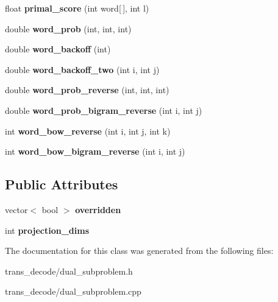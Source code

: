 \begin{DoxyCompactItemize}
\item 
\hypertarget{class_subproblem_adfba5511e1f004b989f7b2e03d998c4e}{
float {\bfseries primal\_\-score} (int word\mbox{[}$\,$\mbox{]}, int l)}
\label{class_subproblem_adfba5511e1f004b989f7b2e03d998c4e}

\item 
\hypertarget{class_subproblem_ab5e3b5e167561a79da1d815af120b6bd}{
double {\bfseries word\_\-prob} (int, int, int)}
\label{class_subproblem_ab5e3b5e167561a79da1d815af120b6bd}

\item 
\hypertarget{class_subproblem_acc456e9852f19058da2d884feec15679}{
double {\bfseries word\_\-backoff} (int)}
\label{class_subproblem_acc456e9852f19058da2d884feec15679}

\item 
\hypertarget{class_subproblem_afd0b98fea6ebb39ae5ad46d1010cb6a3}{
double {\bfseries word\_\-backoff\_\-two} (int i, int j)}
\label{class_subproblem_afd0b98fea6ebb39ae5ad46d1010cb6a3}

\item 
\hypertarget{class_subproblem_a32718cd109a52be59a7eecd3dc5f4c8a}{
double {\bfseries word\_\-prob\_\-reverse} (int, int, int)}
\label{class_subproblem_a32718cd109a52be59a7eecd3dc5f4c8a}

\item 
\hypertarget{class_subproblem_ab612e729dd11b5ac27ce9f67e0135c0a}{
double {\bfseries word\_\-prob\_\-bigram\_\-reverse} (int i, int j)}
\label{class_subproblem_ab612e729dd11b5ac27ce9f67e0135c0a}

\item 
\hypertarget{class_subproblem_a522f5f38fddff38424fe3958104a9612}{
int {\bfseries word\_\-bow\_\-reverse} (int i, int j, int k)}
\label{class_subproblem_a522f5f38fddff38424fe3958104a9612}

\item 
\hypertarget{class_subproblem_a1bce1ad18ee9c123677f39cccda7feb5}{
int {\bfseries word\_\-bow\_\-bigram\_\-reverse} (int i, int j)}
\label{class_subproblem_a1bce1ad18ee9c123677f39cccda7feb5}

\end{DoxyCompactItemize}
\subsection*{Public Attributes}
\begin{DoxyCompactItemize}
\item 
\hypertarget{class_subproblem_ab162552f8af9ee111227f6ec30b7a4f5}{
vector$<$ bool $>$ {\bfseries overridden}}
\label{class_subproblem_ab162552f8af9ee111227f6ec30b7a4f5}

\item 
\hypertarget{class_subproblem_aa981fb8aa661221937b3cd021d72c396}{
int {\bfseries projection\_\-dims}}
\label{class_subproblem_aa981fb8aa661221937b3cd021d72c396}

\end{DoxyCompactItemize}


The documentation for this class was generated from the following files:\begin{DoxyCompactItemize}
\item 
trans\_\-decode/dual\_\-subproblem.h\item 
trans\_\-decode/dual\_\-subproblem.cpp\end{DoxyCompactItemize}
